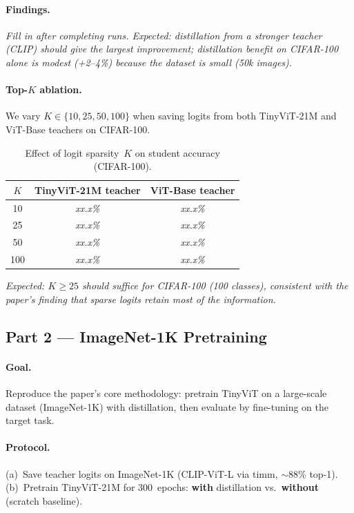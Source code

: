 \documentclass[10pt,twocolumn]{article}
\begin{document}
\paragraph{Findings.}
\textit{%
Fill in after completing runs.
Expected: distillation from a stronger teacher (CLIP) should give the
largest improvement; distillation benefit on CIFAR-100 alone is modest
(+2--4\%) because the dataset is small (50k images).}

\paragraph{Top-$K$ ablation.}
We vary $K \in \{10, 25, 50, 100\}$ when saving logits from both
TinyViT-21M and ViT-Base teachers on CIFAR-100.

\begin{table}[h]
\centering
\caption{Effect of logit sparsity~$K$ on student accuracy (CIFAR-100).}
\label{tab:topk}
\small
\begin{tabular}{@{}ccc@{}}
\toprule
$K$ & TinyViT-21M teacher & ViT-Base teacher \\
\midrule
10  & \textit{xx.x\%} & \textit{xx.x\%} \\
25  & \textit{xx.x\%} & \textit{xx.x\%} \\
50  & \textit{xx.x\%} & \textit{xx.x\%} \\
100 & \textit{xx.x\%} & \textit{xx.x\%} \\
\bottomrule
\end{tabular}
\end{table}

\textit{Expected: $K\!\ge\!25$ should suffice for CIFAR-100 (100 classes),
consistent with the paper's finding that sparse logits retain most of the
information.}

\subsection{Part 2 --- ImageNet-1K Pretraining}

\paragraph{Goal.} Reproduce the paper's core methodology: pretrain
TinyViT on a large-scale dataset (ImageNet-1K) with distillation, then
evaluate by fine-tuning on the target task.

\paragraph{Protocol.}
(a)~Save teacher logits on ImageNet-1K (CLIP-ViT-L via timm, $\sim$88\% top-1).
(b)~Pretrain TinyViT-21M for 300~epochs: \textbf{with} distillation vs.\
\textbf{without} (scratch baseline).
\end{document}

